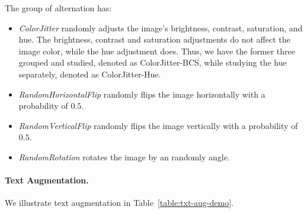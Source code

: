 \documentclass[letterpaper]{article} %
\begin{document}
The group of alternation has:
\begin{itemize}
    \item \textit{ColorJitter} randomly adjusts the image's brightness, contrast, saturation, and hue. The brightness, contrast and saturation adjustments do not affect the image color, while the hue adjustment does. Thus, we have the former three grouped and studied, denoted as ColorJitter-BCS, while studying the hue separately, denoted as ColorJitter-Hue.
    
    \item \textit{RandomHorizontalFlip} randomly flips the image horizontally with a probability of $0.5$.

    \item \textit{RandomVerticalFlip} randomly flips the image vertically with a probability of $0.5$.

    \item \textit{RandomRotation} rotates the image by an randomly angle.
\end{itemize}

\paragraph{Text Augmentation.}
We illustrate text augmentation in Table~\ref{table:txt-aug-demo}.
\end{document}
